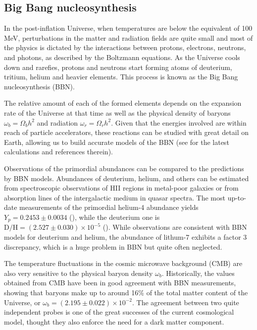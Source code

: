    \subsection{Big Bang nucleosynthesis}
    \label{intro:probes:bbn}

    In the post-inflation Universe, when temperatures
    are below the equivalent of 100 MeV, perturbations in the
    matter and radiation fields are quite 
    small and most of the physics is dictated by the interactions 
    between protons, electrons, neutrons, and photons,
    as described by the Boltzmann equations. 
    As the Universe cools down and rarefies, protons and neutrons 
    start forming atoms of deuterium, tritium, helium and heavier elements.
    This process is known as the Big Bang nucleosynthesis (BBN).

    The relative amount of each of the formed elements depends on the expansion rate 
    of the Universe at that time as well as the physical density of baryons 
    $\omega_b = \Omega_b h^2$ and radiation $\omega_r = \Omega_r h^2$.
    Given that the energies involved are within reach of particle 
    accelerators, these reactions can be studied with great detail on Earth,
    allowing us to build accurate models of the BBN 
    (see \cite{pitrouNewTensionCosmological2021} for the latest calculations
    and references therein). 
    
    Observations of the primordial abundances can be compared to the predictions 
    by BBN models. Abundances of deuterium, helium, and others can be estimated 
    from spectroscopic observations of HII regions in metal-poor galaxies 
    or from absorption lines of the intergalactic medium in quasar spectra. 
    The most up-to-date measurements of the primordial helium-4 abundance yields 
    $Y_p = 0.2453 \pm 0.0034$ (\cite{averImprovingHeliumAbundance2021}), while
    the deuterium one is $\mathrm{D/H} = (2.527 \pm 0.030) \times 10^{-5}$
    (\cite{pitrouNewTensionCosmological2021}). 
    While observations are consistent with BBN models for deuterium and helium, 
    the abundance of lithum-7 exhibits a factor 3 discrepancy, which is a huge problem 
    in BBN but quite often neglected. 
    
    The temperature fluctuations in the cosmic microwave background (CMB) are
    also very sensitive to the physical baryon density $\omega_b$. 
    Historically, the values obtained from CMB have been in good agreement 
    with BBN measurements, showing that baryons make up to around 16\% of the total 
    matter content of the Universe, or $\omega_b = (2.195 \pm  0.022)\times 10^{-2}$. 
    The agreement between two quite independent probes is one of the great successes 
    of the current cosmological model, thought they also enforce the need for a dark matter 
    component.  

